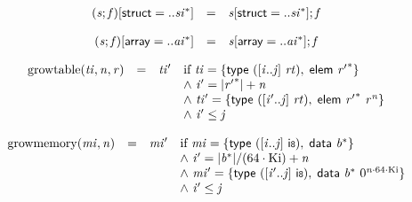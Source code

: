 $$
\begin{array}{@{}lcl@{}l@{}}
({\mathit{s}} ; {\mathit{f}}){}[\mathsf{struct} = ..{{\mathit{si}}^\ast}] &=& {\mathit{s}}{}[\mathsf{struct} = ..{{\mathit{si}}^\ast}] ; {\mathit{f}} &  \\
\end{array}
$$

$$
\begin{array}{@{}lcl@{}l@{}}
({\mathit{s}} ; {\mathit{f}}){}[\mathsf{array} = ..{{\mathit{ai}}^\ast}] &=& {\mathit{s}}{}[\mathsf{array} = ..{{\mathit{ai}}^\ast}] ; {\mathit{f}} &  \\
\end{array}
$$

\vspace{1ex}

$$
\begin{array}{@{}lcl@{}l@{}}
{\mathrm{growtable}}({\mathit{ti}}, {\mathit{n}}, {\mathit{r}}) &=& {\mathit{ti}'} &\quad
  \mbox{if}~{\mathit{ti}} = \{ \begin{array}[t]{@{}l@{}}
\mathsf{type}~({}[{\mathit{i}} .. {\mathit{j}}]~{\mathit{rt}}),\; \mathsf{elem}~{{\mathit{r}'}^\ast} \}\end{array} \\
 &&&\quad {\land}~{\mathit{i}'} = {|{{\mathit{r}'}^\ast}|} + {\mathit{n}} \\
 &&&\quad {\land}~{\mathit{ti}'} = \{ \begin{array}[t]{@{}l@{}}
\mathsf{type}~({}[{\mathit{i}'} .. {\mathit{j}}]~{\mathit{rt}}),\; \mathsf{elem}~{{\mathit{r}'}^\ast}~{{\mathit{r}}^{{\mathit{n}}}} \}\end{array} \\
 &&&\quad {\land}~{\mathit{i}'} \leq {\mathit{j}} \\
\end{array}
$$

$$
\begin{array}{@{}lcl@{}l@{}}
{\mathrm{growmemory}}({\mathit{mi}}, {\mathit{n}}) &=& {\mathit{mi}'} &\quad
  \mbox{if}~{\mathit{mi}} = \{ \begin{array}[t]{@{}l@{}}
\mathsf{type}~({}[{\mathit{i}} .. {\mathit{j}}]~\mathsf{i{\scriptstyle8}}),\; \mathsf{data}~{{\mathit{b}}^\ast} \}\end{array} \\
 &&&\quad {\land}~{\mathit{i}'} = {|{{\mathit{b}}^\ast}|} / (64 \cdot {\mathrm{Ki}}) + {\mathit{n}} \\
 &&&\quad {\land}~{\mathit{mi}'} = \{ \begin{array}[t]{@{}l@{}}
\mathsf{type}~({}[{\mathit{i}'} .. {\mathit{j}}]~\mathsf{i{\scriptstyle8}}),\; \mathsf{data}~{{\mathit{b}}^\ast}~{0^{{\mathit{n}} \cdot 64 \cdot {\mathrm{Ki}}}} \}\end{array} \\
 &&&\quad {\land}~{\mathit{i}'} \leq {\mathit{j}} \\
\end{array}
$$

